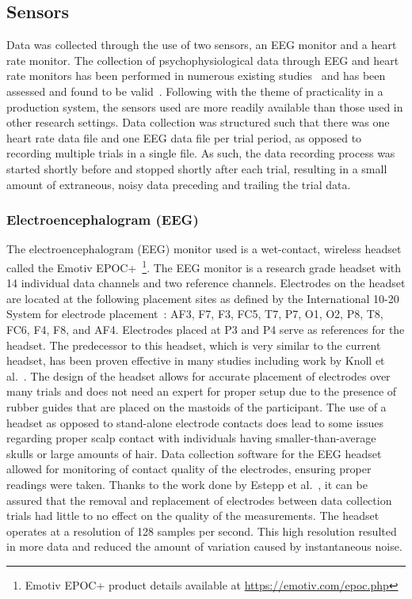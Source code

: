 \documentclass[11pt]{article}
\begin{document}
	\subsection{Sensors}
	Data was collected through the use of two sensors, an EEG monitor and a heart rate monitor. The collection of psychophysiological data through EEG and heart rate monitors has been performed in numerous existing studies~\cite{Wilson, Yang, Wang_Z} and has been assessed and found to be valid~\cite{Sweller}. Following with the theme of practicality in a production system, the sensors used are more readily available than those used in other research settings. Data collection was structured such that there was one heart rate data file and one EEG data file per trial period, as opposed to recording multiple trials in a single file. As such, the data recording process was started shortly before and stopped shortly after each trial, resulting in a small amount of extraneous, noisy data preceding and trailing the trial data.
		
		\subsubsection{Electroencephalogram (EEG)}
		The electroencephalogram (EEG) monitor used is a wet-contact, wireless headset called the Emotiv EPOC+~\footnote{Emotiv EPOC+ product details available at \url{https://emotiv.com/epoc.php}}. The EEG monitor is a research grade headset with 14 individual data channels and two reference channels. Electrodes on the headset are located at the following placement sites as defined by the International 10-20 System for electrode placement~\cite{Jasper}: AF3, F7, F3, FC5, T7, P7, O1, O2, P8, T8, FC6, F4, F8, and AF4. Electrodes placed at P3 and P4 serve as references for the headset. The predecessor to this headset, which is very similar to the current headset, has been proven effective in many studies including work by Knoll et al.~\cite{Knoll}. The design of the headset allows for accurate placement of electrodes over many trials and does not need an expert for proper setup due to the presence of rubber guides that are placed on the mastoids of the participant. The use of a headset as opposed to stand-alone electrode contacts does lead to some issues regarding proper scalp contact with individuals having smaller-than-average skulls or large amounts of hair. Data collection software for the EEG headset allowed for monitoring of contact quality of the electrodes, ensuring proper readings were taken. Thanks to the work done by Estepp et al.~\cite{Estepp_2015}, it can be assured that the removal and replacement of electrodes between data collection trials had little to no effect on the quality of the measurements. The headset operates at a resolution of 128 samples per second. This high resolution resulted in more data and reduced the amount of variation caused by instantaneous noise.
			
\end{document}

